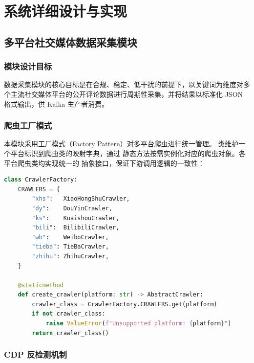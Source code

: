 
\chapter{系统详细设计与实现}

\section{多平台社交媒体数据采集模块}

\subsection{模块设计目标}

数据采集模块的核心目标是在合规、稳定、低干扰的前提下，以关键词为维度对多个主流社交媒体平台的公开评论数据进行周期性采集，并将结果以标准化 JSON 格式输出，供 Kafka 生产者消费。

\subsection{爬虫工厂模式}

本模块采用工厂模式（Factory Pattern）对多平台爬虫进行统一管理。 类维护一个平台标识到爬虫类的映射字典，通过  静态方法按需实例化对应的爬虫对象。各平台爬虫类均实现统一的  抽象接口，保证下游调用逻辑的一致性：

\begin{lstlisting}[language=Python, caption={CrawlerFactory 工厂类核心实现}, label={lst:factory}]
class CrawlerFactory:
    CRAWLERS = {
        "xhs":   XiaoHongShuCrawler,
        "dy":    DouYinCrawler,
        "ks":    KuaishouCrawler,
        "bili":  BilibiliCrawler,
        "wb":    WeiboCrawler,
        "tieba": TieBaCrawler,
        "zhihu": ZhihuCrawler,
    }

    @staticmethod
    def create_crawler(platform: str) -> AbstractCrawler:
        crawler_class = CrawlerFactory.CRAWLERS.get(platform)
        if not crawler_class:
            raise ValueError(f"Unsupported platform: {platform}")
        return crawler_class()
\end{lstlisting}

\subsection{CDP 反检测机制}

